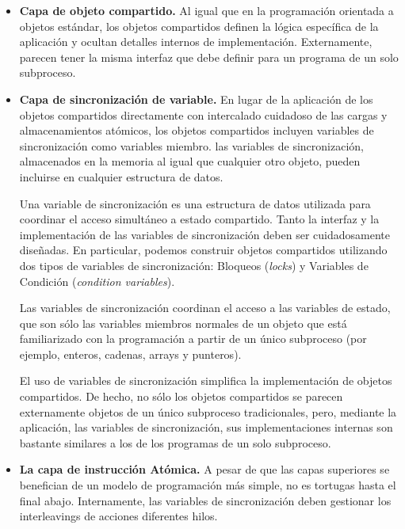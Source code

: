 \documentclass[10pt]{book}
\begin{document}
\begin{itemize}
\item \textbf{Capa de objeto compartido.} Al igual que en la programación orientada a objetos estándar, los objetos compartidos definen la lógica específica de la aplicación y ocultan detalles internos de implementación. Externamente, parecen tener la misma interfaz que debe definir para un programa de un solo subproceso.

\item \textbf{Capa de sincronización de variable.} En lugar de la aplicación de los objetos compartidos directamente con
intercalado cuidadoso de las cargas y almacenamientos atómicos, los objetos compartidos incluyen variables de sincronización como variables miembro. las variables de sincronización, almacenados en la memoria al igual que cualquier otro objeto, pueden incluirse en cualquier estructura de datos.

Una variable de sincronización es una estructura de datos utilizada para coordinar el acceso simultáneo a estado compartido. Tanto la interfaz y la implementación de las variables de sincronización deben ser cuidadosamente diseñadas. En particular, podemos construir objetos compartidos utilizando dos tipos de variables de sincronización: Bloqueos (\textit{locks}) y Variables de Condición (\textit{condition variables}).

Las variables de sincronización coordinan el acceso a las variables de estado, que son sólo las variables miembros normales de un objeto que está familiarizado con la programación a partir de un único subproceso (por ejemplo, enteros, cadenas, arrays y punteros).

El uso de variables de sincronización simplifica la implementación de objetos compartidos. De hecho, no sólo los objetos compartidos se parecen externamente objetos de un único subproceso tradicionales, pero, mediante la aplicación, las variables de sincronización, sus implementaciones internas son bastante similares a los de los programas de un solo subproceso.

\item \textbf{La capa de instrucción Atómica.} A pesar de que las capas superiores se benefician de un modelo de programación más simple, no es tortugas hasta el final abajo. Internamente, las variables de sincronización deben gestionar los interleavings de acciones diferentes hilos.


\end{itemize}
\end{document}
